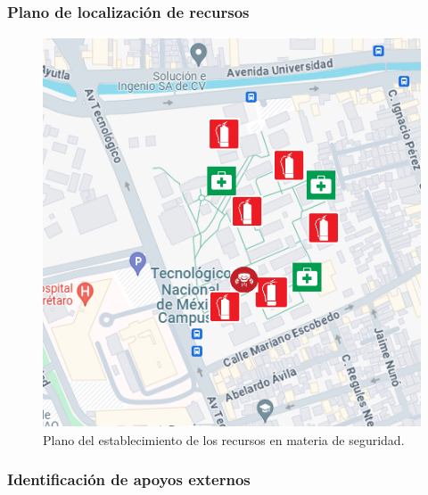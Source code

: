     \subsubsection{Plano de localización de recursos}
    \begin{figure}[H]
        \centering
        \includegraphics[scale=0.45]{35/Img/mapaEB.png}
        \caption{Plano del establecimiento de los recursos en materia de seguridad.}
    \end{figure}
    
    \subsubsection{ Identificación de apoyos externos}
    
